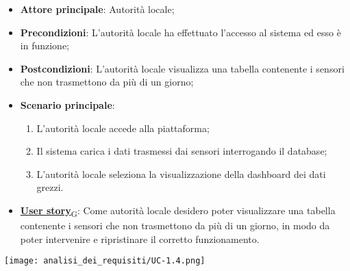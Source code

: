 \begin{itemize}
	\item \textbf{Attore principale}: Autorità locale;
	\item \textbf{Precondizioni}: L'autorità locale ha effettuato l'accesso al sistema ed esso è in funzione;
	\item \textbf{Postcondizioni}: L'autorità locale visualizza una tabella contenente i sensori che non trasmettono da più di un giorno;
	\item \textbf{Scenario principale}:
	      \begin{enumerate}
		      \item L'autorità locale accede alla piattaforma;
		      \item Il sistema carica i dati trasmessi dai sensori interrogando il database;
		      \item L'autorità locale seleziona la visualizzazione della dashboard dei dati grezzi.
	      \end{enumerate}
	\item \href{https://7last.github.io/docs/rtb/documentazione-interna/glossario\#user-story}{\textbf{User story}\textsubscript{G}}:
	      Come autorità locale desidero poter visualizzare una tabella contenente i sensori che non trasmettono da più di un giorno, in modo da poter intervenire e ripristinare il corretto funzionamento.
\end{itemize}
\begin{center}
	\texttt{[image: analisi\_dei\_requisiti/UC-1.4.png]}
\end{center}

